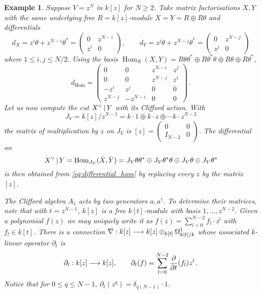 \documentclass[english,letter paper,12pt,leqno]{article}
\theoremstyle{example}
\newtheorem{example}[theorem]{Example}
\numberwithin{equation}{section}
\def\Hom{\operatorname{Hom}}
\begin{document}
\begin{example} Suppose $V = z^N$ in $k[z]$ for $N \ge 2$. Take matrix factorisations $X,Y$ with the same underlying free $R = k[z]$-module $X = Y = R \oplus R \theta$ and differentials
\[
d_X = z^i \theta + z^{N-i} \theta^* = \begin{pmatrix} 0 & z^{N-i} \\ z^i & 0 \end{pmatrix}, \qquad d_Y = z^j \theta + z^{N-j} \theta^* = \begin{pmatrix} 0 & z^{N-j}\\ z^j & 0 \end{pmatrix}
\]
where $1 \le i,j \le N/2$. Using the basis $\Hom_R(X,Y) = R \theta \theta^* \oplus R \theta^* \theta \oplus R\theta \oplus R \theta^*$,
\begin{equation}\label{eq:differential_hom}
d_{\Hom} = \begin{pmatrix} 0 & 0 & z^{N-i} & z^j \\ 
0 & 0 & z^{N-j} & z^i \\
-z^i & z^j & 0 & 0 \\
z^{N-j} & -z^{N-i} & 0 & 0 \end{pmatrix}\,.
\end{equation}
Let us now compute the cut $X^{\vee} \,|\, Y$ with its Clifford action. With
\[
J_V = k[z]/z^{N-1} = k \cdot 1 \oplus k \cdot z \oplus \cdots k \cdot z^{N-2}
\]
the matrix of multiplication by $z$ on $J_V$ is $[z] = \begin{pmatrix} 0 & 0\\ I_{N-2} & 0 \end{pmatrix}$. The differential on
\[
X^{\vee} \l Y = \Hom_{J_V}( \bar{X}, \bar{Y} ) = J_V \theta \theta^* \oplus J_V \theta^* \theta \oplus J_V\theta \oplus J_V \theta^*
\]
is then obtained from \eqref{eq:differential_hom} by replacing every $z$ by the matrix $[z]$.

The Clifford algebra $A_1$ acts by two generators $a, a^\dagger$. To determine their matrices, note that with $t = z^{N-1}$, $k[z]$ is a free $k[t]$-module with basis $1, \ldots, z^{N-2}$. Given a polynomial $f(z)$ we may uniquely write it as $f(z) = \sum_{l = 0}^{N-2} f_l \cdot z^l$ with $f_l \in k[t]$. There is a connection $\nabla: k[z] \longrightarrow k[z] \otimes_{k[t]} \Omega^1_{k[t]/k}$ whose associated $k$-linear operator $\partial_t$ is
\[
\partial_t: k[z] \longrightarrow k[z], \qquad \partial_t(f) = \sum_{l = 0}^{N-2} \frac{\partial}{\partial t}( f_l ) z^l \,.
\]
Notice that for $0 \le q \le N - 1$, $\partial_t(z^q) = \delta_{q (N-1)} \cdot 1$.


\end{example}
\end{document}
